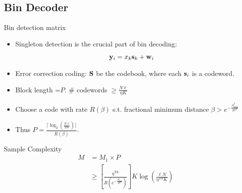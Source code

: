 \documentclass[10pt]{beamer}
\begin{document}
\subsection{Bin Decoder}
\begin{frame}{Bin detection matrix}
\begin{itemize}
\item Singleton detection is the crucial part of bin decoding:
\begin{equation*}
\mathbf{y}_i=x_{k}\mathbf{s}_k +\mathbf{w}_i
\end{equation*} 
\item Error correction coding: $\mathbf{S}$ be the codebook, where each $\mathbf{s}_i$ is a codeword.
\item Block length =$P$.  $\#$ codewords $\geq \frac{N\ell}{\eta K}$
\item Choose a code with rate $R(\beta)$ s.t. fractional minimum distance $\beta >e^{-\frac{A_{\text{min}}^{2}}{2\sigma^2}}$
\item Thus $P=\frac{\lceil {\log_2(\frac{N\ell}{\eta K})}\rceil}{R(\beta)}$.
\end{itemize} 
\begin{block}{Sample Complexity}
 \begin{align*}
  M&=M_1\times P \\
   &\geq \left[\frac{\eta^{\text{Th}}}{R\left(e^{-\frac{A_{\text{min}}^{2}}{2\sigma^2}}\right)}\right] K\log\left(\frac{\ell N}{\eta^{\text{Th}} K}\right)
\end{align*} 
\end{block}
\end{frame}
\end{document}
